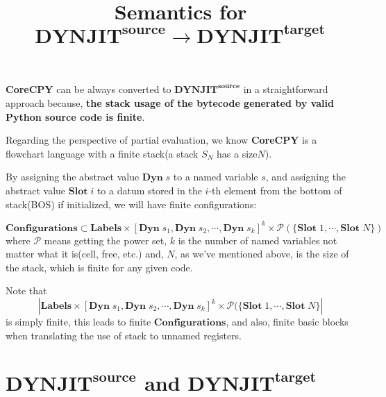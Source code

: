 \documentclass[12pt, a4paper]{report}
\title{Semantics for $\mathbf{DYNJIT}^\mathbf{source} \rightarrow \mathbf{DYNJIT}^\mathbf{target}$}
\begin{document}
\maketitle

\textbf{CoreCPY} can be always converted to $\mathbf{DYNJIT}^\mathbf{source}$
in a straightforward approach because,
\textbf{the stack usage of the bytecode generated by valid Python source code is finite}.

Regarding the perspective of partial evaluation,
we know \textbf{CoreCPY} is a flowchart language with a finite stack(a stack $S_N$ has a size$N$).

By assigning the abstract value $\mathbf{Dyn}\; s$ to a named variable $s$,
and assigning the abstract value $\mathbf{Slot}\; i$ to a datum stored in the $i$-th element from the bottom of stack(BOS) if initialized,
we will have finite configurations:

$$ \mathbf{Configurations} \subset \mathbf{Labels} \times 
\left[\mathbf{Dyn}\; s_1, \mathbf{Dyn}\; s_2, \cdots, \mathbf{Dyn}\; s_k \right]^k
\times \mathcal {P}(\{\mathbf{Slot}\; 1, \cdots, \mathbf {Slot}\; N \})
$$
where 
$\mathcal {P}$ means getting the power set, $k$ is the number of named variables not matter what it is(cell, free, etc.) and,
$N$, as we've mentioned above, is the size of the stack, which is finite for any given code.

Note that
$$ \left| \mathbf{Labels} \times 
\left[\mathbf{Dyn}\; s_1, \mathbf{Dyn}\; s_2, \cdots, \mathbf{Dyn}\; s_k \right]^k
\times \mathcal {P}(\{\mathbf{Slot}\; 1, \cdots, \mathbf {Slot}\; N \} \right| $$ is simply finite,
this leads to finite $\mathbf{Configurations}$, and also, finite basic blocks
when translating the use of stack to unnamed registers.

\newpage

\section*{
    $\mathbf{DYNJIT}^{\mathbf{source}}$ 
    and 
    $\mathbf{DYNJIT}^{\mathbf{target}}$
}
\end{document}
